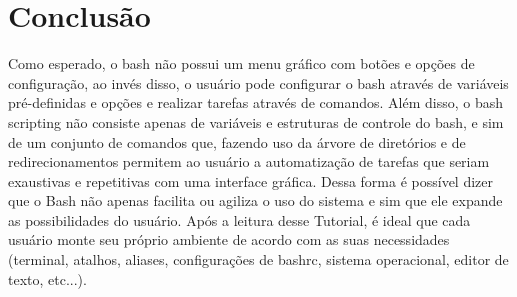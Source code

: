 \documentclass[oneside, 11 pt]{article}
\begin{document}
	\section{Conclusão}
	Como esperado, o bash não possui um menu gráfico com botões e opções de configuração, ao invés disso, o usuário pode configurar o bash através de variáveis pré-definidas e opções e realizar tarefas através de comandos. Além disso, o bash scripting não consiste apenas de variáveis e estruturas de controle do bash, e sim de um conjunto de comandos que, fazendo uso da árvore de diretórios e de redirecionamentos permitem ao usuário a automatização de tarefas que seriam exaustivas e repetitivas com uma interface gráfica. Dessa forma é possível dizer que o Bash não apenas facilita ou agiliza o uso do sistema e sim que ele expande as possibilidades do usuário. Após a leitura desse Tutorial, é ideal que cada usuário monte seu próprio ambiente de acordo com as suas necessidades (terminal, atalhos, aliases, configurações de bashrc, sistema operacional, editor de texto, etc...).
	



\end{document}
